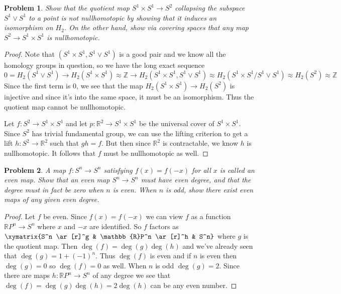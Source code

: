 \documentclass{article}
\newtheorem{problem}{Problem}
\begin{document}
\begin{problem}
Show that the quotient map $S^1 \times S^1 \to S^2$ collapsing the subspace $S^1 \vee S^1$ to a point is not nullhomotopic by showing that it induces an isomorphism on $H_2$. On the other hand, show via covering spaces that any map $S^2 \to S^1 \times S^1$ is nullhomotopic.
\end{problem}
\begin{proof}
Note that $(S^1 \times S^1, S^1 \vee S^1)$ is a good pair and we know all the homology groups in question, so we have the long exact sequence
\[
0 = H_2(S^1 \vee S^1) \to H_2(S^1 \times S^1) \approx \mathbb{Z} \to H_2(S^1 \times S^1, S^1 \vee S^1) \approx H_2(S^1 \times S^1/S^1 \vee S^1) \approx H_2(S^2) \approx \mathbb{Z}
\]
Since the first term is $0$, we see that the map $H_2(S^1 \times S^1) \to H_2(S^2)$ is injective and since it's into the same space, it must be an isomorphism. Thus the quotient map cannot be nullhomotopic.

Let $f : S^2 \to S^1 \times S^1$ and let $p : \mathbb{R}^2 \to S^1 \times S^1$ be the universal cover of $S^1 \times S^1$. Since $S^2$ has trivial fundamental group, we can use the lifting criterion to get a lift $h : S^2 \to \mathbb{R}^2$ such that $gh = f$. But then since $\mathbb{R}^2$ is contractable, we know $h$ is nullhomotopic. It follows that $f$ must be nullhomotopic as well.
\end{proof}

\begin{problem}
A map $f : S^n \to S^n$ satisfying $f(x) = f(-x)$ for all $x$ is called an \emph{even map}. Show that an even map $S^n \to S^n$ must have even degree, and that the degree must in fact be zero when $n$ is even. When $n$ is odd, show there exist even maps of any given even degree.
\end{problem}
\begin{proof}
Let $f$ be even. Since $f(x) = f(-x)$ we can view $f$ as a function $\mathbb{R}P^n \to S^n$ where $x$ and $-x$ are identified. So $f$ factors as $\xymatrix{S^n \ar[r]^g & \mathbb{R}P^n \ar[r]^h & S^n}$ where $g$ is the quotient map. Then $\deg(f) = \deg(g) \deg(h)$ and we've already seen that $\deg(g) = 1 + (-1)^n$. Thus $\deg(f)$ is even and if $n$ is even then $\deg(g) = 0$ so $\deg(f) = 0$ as well. When $n$ is odd $\deg(g) = 2$. Since there are maps $h : \mathbb{R}P^n \to S^n$ of any degree we see that $\deg(f) = \deg(g) \deg(h) = 2\deg(h)$ can be any even number.
\end{proof}
\end{document}
